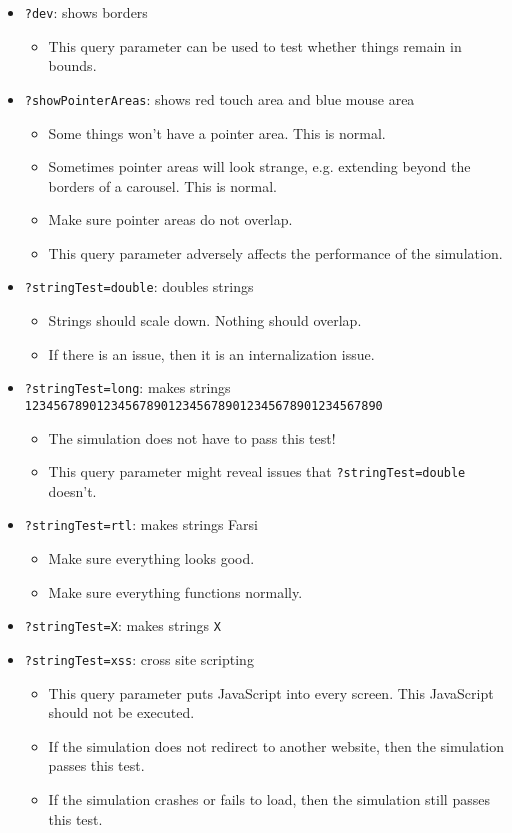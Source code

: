 \documentclass[titlepage]{article}
\begin{document}
		\begin{itemize}
			\item \verb|?dev|: shows borders
				\begin{itemize}
					\item This query parameter can be used to test whether things remain in bounds.
				\end{itemize}
			\item \verb|?showPointerAreas|: shows red touch area and blue mouse area
				\begin{itemize}
					\item Some things won't have a pointer area. This is normal.
					\item Sometimes pointer areas will look strange, e.g. extending beyond the borders of a carousel. This is normal.
					\item Make sure pointer areas do not overlap.
					\item This query parameter adversely affects the performance of the simulation.
				\end{itemize}
			\item \verb|?stringTest=double|: doubles strings
				\begin{itemize}
					\item Strings should scale down. Nothing should overlap.
					\item If there is an issue, then it is an internalization issue.
				\end{itemize}
			\item \verb|?stringTest=long|: makes strings \verb|12345678901234567890123456789012345678901234567890|
				\begin{itemize}
					\item The simulation does not have to pass this test!
					\item This query parameter might reveal issues that \verb|?stringTest=double| doesn't.
				\end{itemize}
			\item \verb|?stringTest=rtl|: makes strings Farsi
				\begin{itemize}
					\item Make sure everything looks good.
					\item Make sure everything functions normally.
				\end{itemize}
			\item \verb|?stringTest=X|: makes strings \verb|X|
			\item \verb|?stringTest=xss|: cross site scripting
				\begin{itemize}
					\item This query parameter puts JavaScript into every screen. This JavaScript should not be executed.
					\item If the simulation does not redirect to another website, then the simulation passes this test.
					\item If the simulation crashes or fails to load, then the simulation still passes this test.
				\end{itemize}
		\end{itemize}
\end{document}
